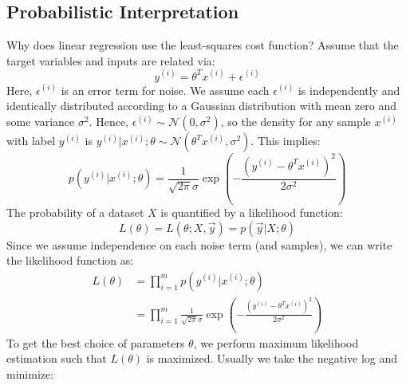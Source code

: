 \documentclass[twoside,twocolumn]{article}
\begin{document}
\subsection{Probabilistic Interpretation}
Why does linear regression use the least-squares cost function? Assume that
the target variables and inputs are related via:
\begin{equation}
  y ^ { ( i ) } = \theta ^ { T } x ^ { ( i ) } + \epsilon ^ { ( i ) }
\end{equation}
Here, $\epsilon^{(i)}$ is an error term for noise. We assume each
$\epsilon^{(i)}$ is independently and identically distributed according to a
Gaussian distribution with mean zero and some variance $\sigma^2$. Hence,
$\epsilon^{(i)} \sim \mathcal { N } \left( 0 , \sigma ^ { 2 } \right)$, so
the density for any sample $x^{(i)}$ with label $y^{(i)}$ is
$y^{(i)} | x^{(i)}; \theta \sim \mathcal{N} \left( \theta^T x^{(i)}, \sigma^{2} \right)$.
This implies:
\begin{equation}
  p \left( y ^ { ( i ) } | x ^ { ( i ) } ; \theta \right) = \frac { 1 } { \sqrt { 2 \pi } \sigma } \exp \left( - \frac { \left( y ^ { ( i ) } - \theta ^ { T } x ^ { ( i ) } \right) ^ { 2 } } { 2 \sigma ^ { 2 } } \right)
\end{equation}
The probability of a dataset $X$ is quantified by a likelihood function:
\begin{equation}
  L ( \theta ) = L ( \theta ; X , \vec { y } ) = p ( \vec { y } | X ; \theta )
\end{equation}
Since we assume independence on each noise term (and samples), we can write
the likelihood function as:
\begin{equation}
  \begin{aligned}
    L ( \theta ) & = \prod _ { i = 1 } ^ { m } p \left( y ^ { ( i ) } | x ^ { ( i ) } ; \theta \right) \\
    & = \prod _ { i = 1 } ^ { m } \frac { 1 } { \sqrt { 2 \pi } \sigma } \exp \left( - \frac { \left( y ^ { ( i ) } - \theta ^ { T } x ^ { ( i ) } \right) ^ { 2 } } { 2 \sigma ^ { 2 } } \right)
  \end{aligned}
\end{equation}
To get the best choice of parameters $\theta$, we perform maximum likelihood
estimation such that $L(\theta)$ is maximized. Usually we take the negative log
and minimize:
\end{document}
